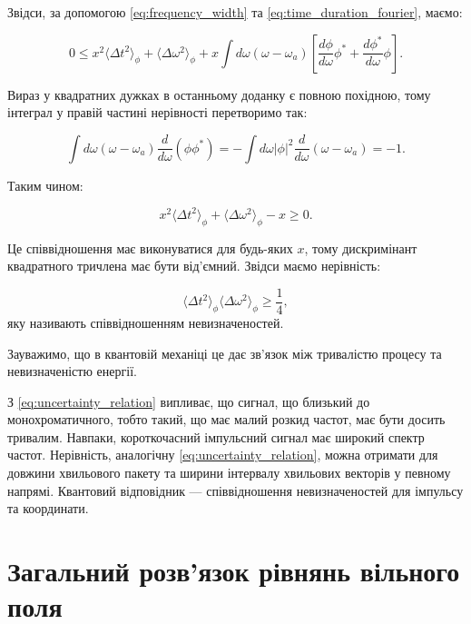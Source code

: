 Звідси, за допомогою \eqref{eq:frequency_width} та \eqref{eq:time_duration_fourier}, маємо:

\begin{equation*}
0 \leq x^2 \langle \Delta t^2 \rangle_{\phi} + \langle \Delta \omega^2 \rangle_{\phi} + x \int d\omega (\omega - \omega_a) \left[ \frac{d\phi}{d\omega}
\phi^{*} + \frac{d\phi^{*}}{d\omega} \phi \right].
\end{equation*}

Вираз у квадратних дужках в останньому доданку є повною похідною, тому інтеграл у правій частині нерівності перетворимо так:

\begin{equation*}
\int d\omega (\omega - \omega_a) \frac{d}{d\omega} (\phi \phi^{*}) = -\int d\omega |\phi|^2 \frac{d}{d\omega} (\omega - \omega_a) = -1.
\end{equation*}

Таким чином:

\begin{equation*}
x^2 \langle \Delta t^2 \rangle_{\phi} + \langle \Delta \omega^2 \rangle_{\phi} - x \geq 0.
\end{equation*}

Це співвідношення має виконуватися для будь-яких \( x \), тому дискримінант квадратного тричлена має бути від’ємний. Звідси маємо нерівність:

\begin{equation}
\langle \Delta t^2 \rangle_{\phi} \langle \Delta \omega^2 \rangle_{\phi} \geq \frac{1}{4},
\label{eq:uncertainty_relation}
\end{equation}
яку називають співвідношенням невизначеностей.

Зауважимо, що в квантовій механіці це дає зв’язок між тривалістю процесу та невизначеністю енергії.

З \eqref{eq:uncertainty_relation} випливає, що сигнал, що близький до монохроматичного, тобто такий, що має малий розкид частот, має бути досить
тривалим. Навпаки, короткочасний імпульсний сигнал має широкий спектр частот. Нерівність, аналогічну \eqref{eq:uncertainty_relation}, можна отримати для
довжини хвильового пакету та ширини інтервалу хвильових векторів у певному напрямі. Квантовий відповідник --- співвідношення невизначеностей для
імпульсу та координати.

\section{Загальний розв’язок рівнянь вільного поля}

